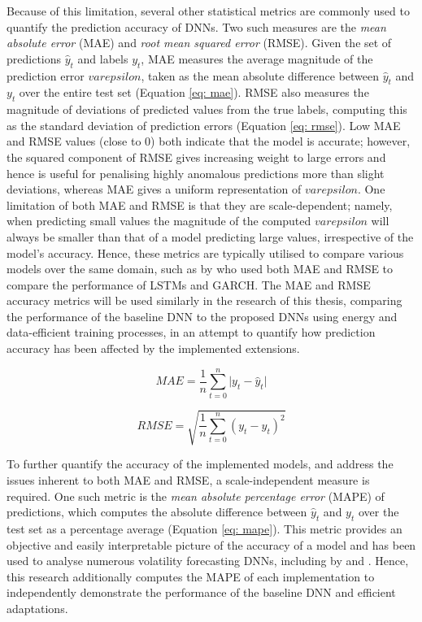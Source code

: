 \documentclass[a4paper, 11pt]{report}
\begin{document}
    Because of this limitation, several other statistical metrics are commonly used to quantify the prediction accuracy of DNNs. Two such measures are the \emph{mean absolute error} (MAE) and \emph{root mean squared error} (RMSE). Given the set of predictions $\hat{y}_t$ and labels $y_t$, MAE measures the average magnitude of the prediction error $varepsilon$, taken as the mean absolute difference between $\hat{y}_t$ and $y_t$ over the entire test set (Equation \ref{eq: mae}). RMSE also measures the magnitude of deviations of predicted values from the true labels, computing this as the standard deviation of prediction errors (Equation \ref{eq: rmse}). Low MAE and RMSE values (close to $0$) both indicate that the model is accurate; however, the squared component of RMSE gives increasing weight to large errors and hence is useful for penalising highly anomalous predictions more than slight deviations, whereas MAE gives a uniform representation of $varepsilon$. One limitation of both MAE and RMSE is that they are scale-dependent; namely, when predicting small values the magnitude of the computed $varepsilon$ will always be smaller than that of a model predicting large values, irrespective of the model's accuracy. Hence, these metrics are typically utilised to compare various models over the same domain, such as by \citet{rodikov-2022} who used both MAE and RMSE to compare the performance of LSTMs and GARCH. The MAE and RMSE accuracy metrics will be used similarly in the research of this thesis, comparing the performance of the baseline DNN to the proposed DNNs using energy and data-efficient training processes, in an attempt to quantify how prediction accuracy has been affected by the implemented extensions. 


    \begin{equation}
        \label{eq: mae}
        MAE = \frac{1}{n} \sum_{t=0}^n \lvert y_t - \hat{y}_t \lvert
    \end{equation}
    
    \begin{equation}
        \label{eq: rmse}
        RMSE = \sqrt{\frac{1}{n} \sum_{t=0}^n (y_t - \hat{y}_t)^2}
    \end{equation}


    To further quantify the accuracy of the implemented models, and address the issues inherent to both MAE and RMSE, a scale-independent measure is required. One such metric is the \emph{mean absolute percentage error }(MAPE) of predictions, which computes the absolute difference between $\hat{y}_t$ and $y_t$ over the test set as a percentage average (Equation \ref{eq: mape}). This metric provides an objective and easily interpretable picture of the accuracy of a model and has been used to analyse numerous volatility forecasting DNNs, including by \citet{xiong-2016} and \citet{zhang-2022}. Hence, this research additionally computes the MAPE of each implementation to independently demonstrate the performance of the baseline DNN and efficient adaptations.
\end{document}
